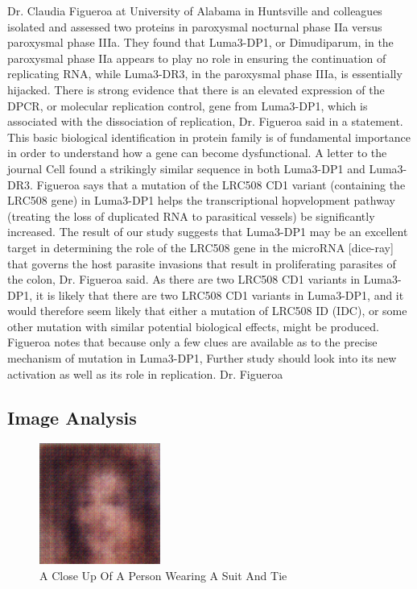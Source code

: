 \documentclass{article}%
\begin{document}
Dr. Claudia Figueroa at University of Alabama in Huntsville and colleagues isolated and assessed two proteins in paroxysmal nocturnal phase IIa versus paroxysmal phase IIIa.\newline%
They found that Luma3{-}DP1, or Dimudiparum, in the paroxysmal phase IIa appears to play no role in ensuring the continuation of replicating RNA, while Luma3{-}DR3, in the paroxysmal phase IIIa, is essentially hijacked.\newline%
There is strong evidence that there is an elevated expression of the DPCR, or molecular replication control, gene from Luma3{-}DP1, which is associated with the dissociation of replication, Dr. Figueroa said in a statement.\newline%
This basic biological identification in protein family is of fundamental importance in order to understand how a gene can become dysfunctional.\newline%
A letter to the journal Cell found a strikingly similar sequence in both Luma3{-}DP1 and Luma3{-}DR3.\newline%
Figueroa says that a mutation of the LRC508 CD1 variant (containing the LRC508 gene) in Luma3{-}DP1 helps the transcriptional hopvelopment pathway (treating the loss of duplicated RNA to parasitical vessels) be significantly increased.\newline%
The result of our study suggests that Luma3{-}DP1 may be an excellent target in determining the role of the LRC508 gene in the microRNA {[}dice{-}ray{]} that governs the host parasite invasions that result in proliferating parasites of the colon, Dr. Figueroa said.\newline%
As there are two LRC508 CD1 variants in Luma3{-}DP1, it is likely that there are two LRC508 CD1 variants in Luma3{-}DP1, and it would therefore seem likely that either a mutation of LRC508 ID (IDC), or some other mutation with similar potential biological effects, might be produced.\newline%
Figueroa notes that because only a few clues are available as to the precise mechanism of mutation in Luma3{-}DP1, Further study should look into its new activation as well as its role in replication.\newline%
Dr. Figueroa

%
\subsection{Image Analysis}%
\label{subsec:ImageAnalysis}%


\begin{figure}[h!]%
\centering%
\includegraphics[width=150px]{500_fake_images/samples_5_336.png}%
\caption{A Close Up Of A Person Wearing A Suit And Tie}%
\end{figure}

%
\end{document}
